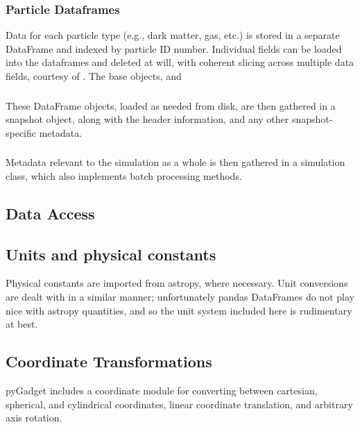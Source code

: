 \subsubsection{Particle Dataframes}
\label{sec:df}
Data for each particle type (e.g., dark matter, gas, etc.) is stored in a separate DataFrame and indexed by particle ID number.  
Individual fields can be loaded into the dataframes and deleted at will, with coherent slicing across multiple data fields, courtesy of .  
The base  objects,  and 

\subsubsection{}
\label{sec:snap}
These DataFrame objects, loaded as needed from disk, are then gathered in a snapshot object, along with the header information, and any other snapshot-specific metadata.  

\subsubsection{}
\label{sec:sim}
Metadata relevant to the simulation as a whole is then gathered in a simulation class, which also implements batch processing methods.

\subsection{Data Access}
\label{sec:fileIO}

\subsection{Units and physical constants}
\label{sec:units}
Physical constants are imported from astropy, where necessary.  Unit conversions are dealt with in a similar manner; unfortunately pandas DataFrames do not play nice with astropy quantities, and so the unit system included here is rudimentary at best.

\subsection{Coordinate Transformations}
\label{sec:coordinates}
pyGadget includes a coordinate module for converting between cartesian, spherical, and cylindrical coordinates, linear coordinate translation, and arbitrary axis rotation.